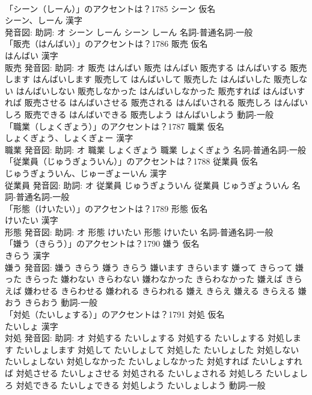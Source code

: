 \documentclass[8pt]{extreport}
\begin{document}
\begin{CJK}{UTF8}{min}
\\	「シーン（しーん）」のアクセントは？1785	シーン 仮名　
\\	シーン、しーん 漢字　
\\	発音図: 助詞: オ	シーン しーん		シーン しーん				名詞-普通名詞-一般 
\\	「販売（はんばい）」のアクセントは？1786	販売 仮名　
\\	はんばい 漢字　
\\	販売 発音図: 助詞: オ	販売 はんばい		販売 はんばい 販売する はんばいする 販売します はんばいします 販売して はんばいして 販売した はんばいした 販売しない はんばいしない 販売しなかった はんばいしなかった 販売すれば はんばいすれば 販売させる はんばいさせる 販売される はんばいされる 販売しろ はんばいしろ 販売できる はんばいできる 販売しよう はんばいしよう				動詞-一般 
\\	「職業（しょくぎょう）」のアクセントは？1787	職業 仮名　
\\	しょくぎょう、しょくぎょー 漢字　
\\	職業 発音図: 助詞: オ	職業 しょくぎょう		職業 しょくぎょう				名詞-普通名詞-一般 
\\	「従業員（じゅうぎょういん）」のアクセントは？1788	従業員 仮名　
\\	じゅうぎょういん、じゅーぎょーいん 漢字　
\\	従業員 発音図: 助詞: オ	従業員 じゅうぎょういん		従業員 じゅうぎょういん				名詞-普通名詞-一般 
\\	「形態（けいたい）」のアクセントは？1789	形態 仮名　
\\	けいたい 漢字　
\\	形態 発音図: 助詞: オ	形態 けいたい		形態 けいたい				名詞-普通名詞-一般 
\\	「嫌う（きらう）」のアクセントは？1790	嫌う 仮名　
\\	きらう 漢字　
\\	嫌う 発音図:	嫌う きらう		嫌う きらう 嫌います きらいます 嫌って きらって 嫌った きらった 嫌わない きらわない 嫌わなかった きらわなかった 嫌えば きらえば 嫌わせる きらわせる 嫌われる きらわれる 嫌え きらえ 嫌える きらえる 嫌おう きらおう				動詞-一般 
\\	「対処（たいしょする）」のアクセントは？1791	対処 仮名　
\\	たいしょ 漢字　
\\	対処 発音図: 助詞: オ	対処する たいしょする		対処する たいしょする 対処します たいしょします 対処して たいしょして 対処した たいしょした 対処しない たいしょしない 対処しなかった たいしょしなかった 対処すれば たいしょすれば 対処させる たいしょさせる 対処される たいしょされる 対処しろ たいしょしろ 対処できる たいしょできる 対処しよう たいしょしよう				動詞-一般 

\end{CJK}
\end{document}
